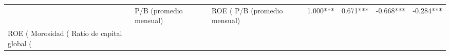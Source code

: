 \begin{tabular}{lllll}
\toprule
 & P/B (promedio mensual) & ROE (%
\midrule
P/B (promedio mensual) & 1.000*** & 0.671*** & -0.668*** & -0.284*** \\
ROE (%
Morosidad (%
Ratio de capital global (%
\bottomrule
\end{tabular}
